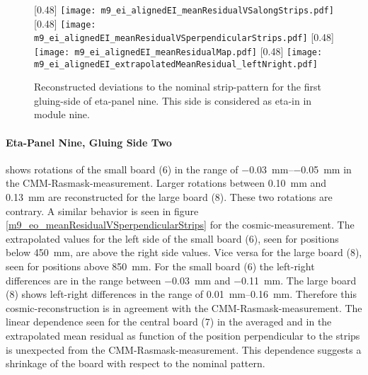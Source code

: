 \documentclass[
twoside,            %
BCOR1.4cm,          %
10pt,               %
headings=normal,    %
headsepline,        %
clearplainpage,		%
final,              %
div=14,
open=right,
bibliography=toc
]{scrreprt}
\begin{document}
\begin{figure}[!h]
	\centering
	[0.48\textwidth]
	{\texttt{[image: m9\_ei\_alignedEI\_meanResidualVSalongStrips.pdf]}}
	\hfill
	[0.48\textwidth]
	{\texttt{[image: m9\_ei\_alignedEI\_meanResidualVSperpendicularStrips.pdf]}}
	\hfill
	[0.48\textwidth]
	{\texttt{[image: m9\_ei\_alignedEI\_meanResidualMap.pdf]}}
	\hfill
	[0.48\textwidth]
	{\texttt{[image: m9\_ei\_alignedEI\_extrapolatedMeanResidual\_leftNright.pdf]}}
	\vspace{-2mm}
	\caption{
		Reconstructed deviations to the nominal strip-pattern for the first gluing-side of eta-panel nine.
		This side is considered as eta-in in module nine.
	}
	\label{eta9gs1} 
\end{figure}

\newpage

\paragraph{Eta-Panel Nine, Gluing Side Two}

shows rotations of the small board (6) in the range of \SIrange{-0.03}{-0.05}{mm} in the CMM-Rasmask-measurement.
Larger rotations between \SI{0.10}{mm} and \SI{0.13}{mm} are reconstructed for the large board (8).
These two rotations are contrary.
A similar behavior is seen in figure \ref{m9_eo_meanResidualVSperpendicularStrips} for the cosmic-measurement.
The extrapolated values for the left side of the small board (6), seen for positions below \SI{450}{mm}, are above the right side values.
Vice versa for the large board (8), seen for positions above \SI{850}{mm}.
For the small board (6) the left-right differences are in the range between \SI{-0.03}{mm} and \SI{-0.11}{mm}.
The large board (8) shows left-right differences in the range of \SIrange{0.01}{0.16}{mm}. 
Therefore this cosmic-reconstruction is in agreement with the CMM-Rasmask-measurement.
The linear dependence seen for the central board (7) in the averaged and in the extrapolated mean residual as function of the position perpendicular to the strips is unexpected from the CMM-Rasmask-measurement.
This dependence suggests a shrinkage of the board with respect to the nominal pattern.
\end{document}
